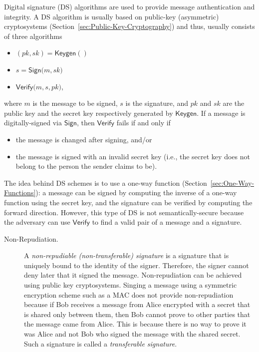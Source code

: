 \documentclass[11pt]{article}
\theoremstyle{plain}
\begin{document}
Digital signature (DS) algorithms are used to provide message authentication
and integrity. A DS algorithm is usually based on public-key (asymmetric)
cryptosystems (Section~\ref{sec:Public-Key-Cryptography}) and thus,
usually consists of three algorithms 
\begin{itemize}
	\item $(pk,sk)=\mathsf{Keygen}()$
	\item $s=\mathsf{Sign(}m,sk\mathsf{)}$
	\item $\mathsf{Verify(}m,s,pk\mathsf{)}$,
\end{itemize}
where $m$ is the message to be signed, $s$ is the signature, and
$pk$ and $sk$ are the public key and the secret key respectively
generated by $\mathsf{Keygen}$.\textsf{ }If a message is digitally-signed
via $\mathsf{Sign}$, then $\mathsf{Verify}$ fails if and only if
\begin{itemize}
	\item the message is changed after signing, and/or
	\item the message is signed with an invalid secret key (i.e., the secret
	key does not belong to the person the sender claims to be).
\end{itemize}
The idea behind DS schemes is to use a one-way function (Section~\ref{sec:One-Way-Functions}):
a message can be signed by computing the inverse of a one-way function
using the secret key, and the signature can be verified by computing
the forward direction. However, this type of DS is not semantically-secure
because the adversary can use $\mathsf{Verify}$ to find a valid pair
of a message and a signature.
\begin{description}
	\item [{Non-Repudiation.}] A \emph{non-repudiable (non-transferable) signature}
	is a signature that is uniquely bound to the identity of the signer.
	Therefore, the signer cannot deny later that it signed the message.
	Non-repudiation can be achieved using public key cryptosystems. Singing
	a message using a symmetric encryption scheme such as a MAC does not
	provide non-repudiation because if Bob receives a message from Alice
	encrypted with a secret that is shared only between them, then Bob
	cannot prove to other parties that the message came from Alice. This
	is because there is no way to prove it was Alice and not Bob who signed
	the message with the shared secret. Such a signature is called a \emph{transferable
		signature}.
\end{description}
\end{document}
